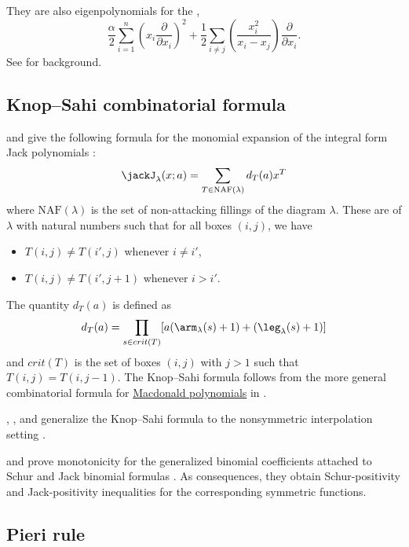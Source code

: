 They are also eigenpolynomials for the
\label{laplaceBeltramiOperator},
\[
\frac{\alpha}{2} \sum_{i=1}^n
\left(x_i\frac{\partial}{\partial x_i}\right)^2
+
\frac{1}{2} \sum_{i\neq j}
\left( \frac{x_i^2}{ x_i - x_j } \right)
\frac{\partial}{\partial x_i}.
\]
See \cite{LapointeLascouxMorse1999,Roberts2000} for background.



\subsection[jackCombinatorialFormula]{Knop--Sahi combinatorial formula}

 and  give the following formula
for the monomial expansion of the integral form Jack polynomials
\cite{KnopSahi1997}:
\[
\jackJ_\lambda (x;a)
=
\sum_{T \in \mathrm{NAF}(\lambda)} d_T(a) x^T
\]
where $\mathrm{NAF}(\lambda)$ is the set of non-attacking fillings of the
diagram $\lambda$.
These are \label{nonAttackingFilling} of
$\lambda$ with natural numbers such that for all boxes $(i,j)$,
we have
\begin{itemize}
\item $T(i,j) \neq T(i',j)$  whenever $i \neq i'$,
\item $T(i,j) \neq T(i',j+1)$  whenever $i \gt i'$.
\end{itemize}
The quantity $d_T(a)$ is defined as
\[
d_T(a)
=
\prod_{s \in crit(T)}
[a( \arm_\lambda(s) +1 ) + ( \leg_\lambda(s) +1 )]
\]
and $crit(T)$ is the set of boxes $(i,j)$ with $j>1$ such that
$T(i,j) = T(i,j-1)$.
The Knop--Sahi formula follows from the more general combinatorial formula for
\hyperref[macdonaldP]{Macdonald polynomials} in \cite{HaglundHaimanLoehr2005}.


, , and 
generalize the Knop--Sahi formula to the nonsymmetric interpolation setting
\cite{NaqviSahiSergel2021x}.

 and  prove monotonicity for the
generalized binomial coefficients attached to Schur and Jack binomial formulas
\cite{ChenSahi2025x}.  As consequences, they obtain Schur-positivity and
Jack-positivity inequalities for the corresponding symmetric functions.



\subsection[jackPieri]{Pieri rule}


